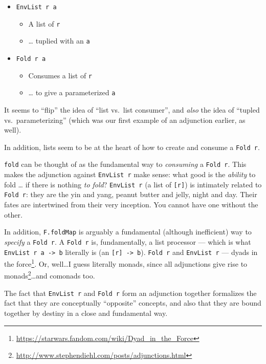 \documentclass[]{article}
\renewcommand{\href}[2]{#2\footnote{\url{#1}}}
\begin{document}
\begin{itemize}
\tightlist
\item
  \texttt{EnvList\ r\ a}

  \begin{itemize}
  \tightlist
  \item
    A list of \texttt{r}
  \item
    \ldots{} tuplied with an \texttt{a}
  \end{itemize}
\item
  \texttt{Fold\ r\ a}

  \begin{itemize}
  \tightlist
  \item
    Consumes a list of \texttt{r}
  \item
    \ldots{} to give a parameterized \texttt{a}
  \end{itemize}
\end{itemize}

It seems to ``flip'' the idea of ``list vs.~list consumer'', and \emph{also} the
idea of ``tupled vs.~parameterizing'' (which was our first example of an
adjunction earlier, as well).

In addition, lists seem to be at the heart of how to create and consume a
\texttt{Fold\ r}.

\texttt{fold} can be thought of as the fundamental way to \emph{consuming} a
\texttt{Fold\ r}. This makes the adjunction against \texttt{EnvList\ r} make
sense: what good is the \emph{ability} to fold \ldots{} if there is nothing
\emph{to fold}? \texttt{EnvList\ r} (a list of \texttt{{[}r{]}}) is intimately
related to \texttt{Fold\ r}: they are the yin and yang, peanut butter and jelly,
night and day. Their fates are intertwined from their very inception. You cannot
have one without the other.

In addition, \texttt{F.foldMap} is arguably a fundamental (although inefficient)
way to \emph{specify} a \texttt{Fold\ r}. A \texttt{Fold\ r} is, fundamentally,
a list processor --- which is what \texttt{EnvList\ r\ a\ -\textgreater{}\ b}
literally is (an \texttt{{[}r{]}\ -\textgreater{}\ b}). \texttt{Fold\ r} and
\texttt{EnvList\ r} ---
\href{https://starwars.fandom.com/wiki/Dyad_in_the_Force}{dyads in the force}.
Or, well\ldots I guess literally monads, since
\href{http://www.stephendiehl.com/posts/adjunctions.html}{all adjunctions give
rise to monads}\ldots and comonads too.

The fact that \texttt{EnvList\ r} and \texttt{Fold\ r} form an adjunction
together formalizes the fact that they are conceptually ``opposite'' concepts,
and also that they are bound together by destiny in a close and fundamental way.
\end{document}
